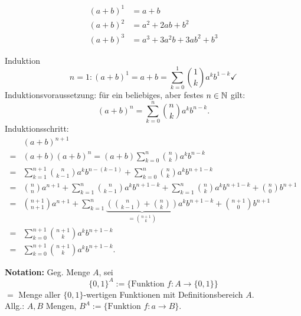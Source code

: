 \documentclass[../ana1.tex]{subfiles}
\begin{document}
\begin{bem}
	\begin{align}
		{(a+b)}^1 & = a+b                     \\
		{(a+b)}^2 & = a^2 + 2ab + b^2         \\
		{(a+b)}^3 & = a^3 +3a^2b + 3ab^2 +b^3
	\end{align}
\end{bem}
\begin{bew} Induktion
	\[ n=1: {(a+b)}^1 = a+b = \sum_{k=0}^{1}\binom{1}{k} a^k b^{1-k} \checkmark{} \]
	Induktionsvoraussetzung: für ein beliebiges, aber festes \(n \in\mathbb{N} \) gilt:
	\[ {(a+b)}^n = \sum_{k=0}^{n} \binom{n}{k} a^k b^{n-k}. \]
	Induktionsschritt:
	\begin{align*}
		 &{(a+b)}^{n+1} \\
		=& (a+b) {(a+b)}^n = (a+b) \sum_{k=0}^{n} \binom{n}{k} a^k b^{n-k} \\
		=& \sum_{k=1}^{n+1} \binom{n}{k-1} a^k b^{n-(k-1)} + \sum_{k=0}^{n} \binom{n}{k} a^k b^{n+1-k} \\
		=& \binom{n}{n} a^{n+1} + \sum_{k=1}^{n} \binom{n}{k-1} a^k b^{n+1-k} + \sum_{k=1}^{n} \binom{n}{k} a^k b^{n+1-k} + \binom{n}{0} b^{n+1} \\
		=& \binom{n+1}{n+1} a^{n+1} + \sum_{k=1}^{n} \underbrace{\left(\binom{n}{k-1} + \binom{n}{k}\right)}_{=\binom{n+1}{k}} a^k b^{n+1-k} + \binom{n+1}{0} b^{n+1} \\
		=& \sum_{k=0}^{n+1} \binom{n+1}{k} a^k b^{n+1-k} \\
		=& \sum_{k=0}^{n+1} \binom{n+1}{k} a^k b^{n+1-k}.
	\end{align*}
\end{bew}

\textbf{Notation:} Geg. Menge \(A\), sei \[ \{0,1\}^A := \{ \text{Funktion }f:A\rightarrow \{0,1\} \} \] \(= \) Menge aller \(\{0,1\}\)-wertigen Funktionen mit Definitionsbereich \(A\).\\
Allg.: \(A,B\) Mengen, \(B^A := \{ \text{Funktion } f: a\rightarrow B\}\).
\end{document}
